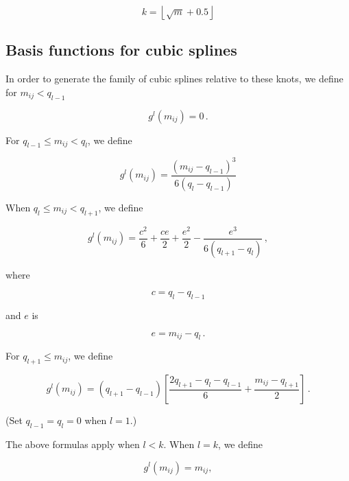 \begin{equation*}
  \label{eq:nofknots}
  k = \left\lfloor\sqrt{m}+0.5\right\rfloor
\end{equation*}


\subsection{Basis functions for cubic splines}

In order to generate the family of cubic splines relative to these knots, we define for $m_{ij}<q_{l-1}$

\begin{equation*}
  \label{eq:A.2}
  g^l(m_{ij})=0\,.
\end{equation*}


For $q_{l-1}\leq m_{ij} <q_l$, we define

\begin{equation*}
  \label{eq:A.3}
  g^l(m_{ij})=\frac{(m_{ij}-q_{l-1})^3}{6(q_l-q_{l-1})}
\end{equation*}

When $q_l\leq m_{ij}< q_{l+1}$, we define

\begin{equation*}
  \label{eq:A.4a}
  g^l(m_{ij}) = \frac{c^2}{6}+\frac{ce}{2}+\frac{e^2}{2}-\frac{e^3}{6(q_{l+1}-q_l)}\,,
\end{equation*}

where

\begin{equation*}
  \label{eq:A.4b}
  c = q_l-q_{l-1}
\end{equation*}

and $e$ is

\begin{equation*}
  \label{eq:A.4c}
  e = m_{ij}-q_l\,.
\end{equation*}

For $q_{l+1}\leq m_{ij}$, we define

\begin{equation*}
  \label{eq:A.5}
  g^l(m_{ij}) = (q_{l+1}-q_{l-1})\left[\frac{2q_{l+1}-q_l-q_{l-1}}{6}+\frac{m_{ij}-q_{l+1}}{2}\right]\,.
\end{equation*}

(Set $q_{l-1}=q_l=0$ when $l=1$.)

The above formulas apply when $l<k$. When $l=k$, we define

\begin{equation*}
  \label{eq:A.6}
 g^l(m_{ij})= m_{ij},
\end{equation*}

